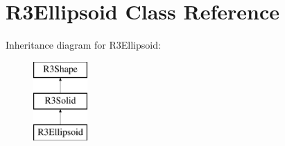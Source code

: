 \hypertarget{class_r3_ellipsoid}{}\section{R3\+Ellipsoid Class Reference}
\label{class_r3_ellipsoid}
Inheritance diagram for R3\+Ellipsoid\+:\begin{figure}[H]
\begin{center}
\leavevmode
\includegraphics[height=3.000000cm]{class_r3_ellipsoid}
\end{center}
\end{figure}
